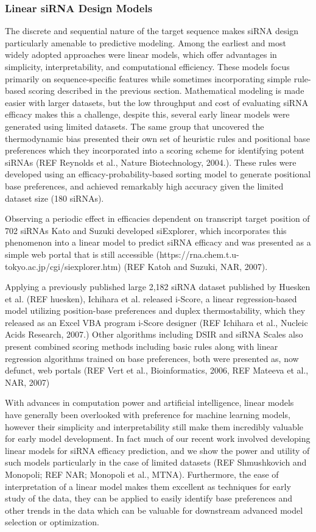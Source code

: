\documentclass{report}
\begin{document}
\subsubsection{Linear siRNA Design Models}
The discrete and sequential nature of the target sequence makes siRNA design particularly amenable to predictive modeling. Among the earliest and most widely adopted approaches were linear models, which offer advantages in simplicity, interpretability, and computational efficiency. These models focus primarily on sequence-specific features while sometimes incorporating simple rule-based scoring described in the previous section. Mathematical modeling is made easier with larger datasets, but the low throughput and cost of evaluating siRNA efficacy makes this a challenge, despite this, several early linear models were generated using limited datasets. The same group that uncovered the thermodynamic bias presented their own set of heuristic rules and positional base preferences which they incorporated into a scoring scheme for identifying potent siRNAs (REF  Reynolds et al., Nature Biotechnology, 2004.). These rules were developed using an efficacy-probability-based sorting model to generate positional base preferences, and achieved remarkably high accuracy given the limited dataset size (180 siRNAs). 

Observing a periodic effect in efficacies dependent on transcript target position of 702 siRNAs Kato and Suzuki developed siExplorer, which incorporates this phenomenon into a linear model to predict siRNA efficacy and was presented as a simple web portal that is still accessible (https://rna.chem.t.u-tokyo.ac.jp/cgi/siexplorer.htm) (REF Katoh and Suzuki, NAR, 2007).
 
Applying a previously published large 2,182 siRNA dataset published by Huesken et al. (REF huesken), Ichihara et al. released i-Score, a linear regression-based model utilizing position-base preferences and duplex thermostability, which they released as an Excel VBA program i-Score designer (REF  Ichihara et al., Nucleic Acids Research, 2007.) Other algorithms including DSIR and siRNA Scales also present combined scoring methods including basic rules along with linear regression algorithms trained on base preferences, both were presented as, now defunct, web portals (REF Vert et al., Bioinformatics, 2006, REF Mateeva et al., NAR, 2007)

With advances in computation power and artificial intelligence, linear models have generally been overlooked with preference for machine learning models, however their simplicity and interpretability still make them incredibly valuable for early model development. In fact much of our recent work involved developing linear models for siRNA efficacy prediction, and we show the power and utility of such models particularly in the case of limited datasets (REF Shmushkovich and Monopoli; REF NAR; Monopoli et al., MTNA). Furthermore, the ease of interpretation of a linear model makes them excellent as techniques for early study of the data, they can be applied to easily identify base preferences and other trends in the data which can be valuable for downstream advanced model selection or optimization.
\end{document}
